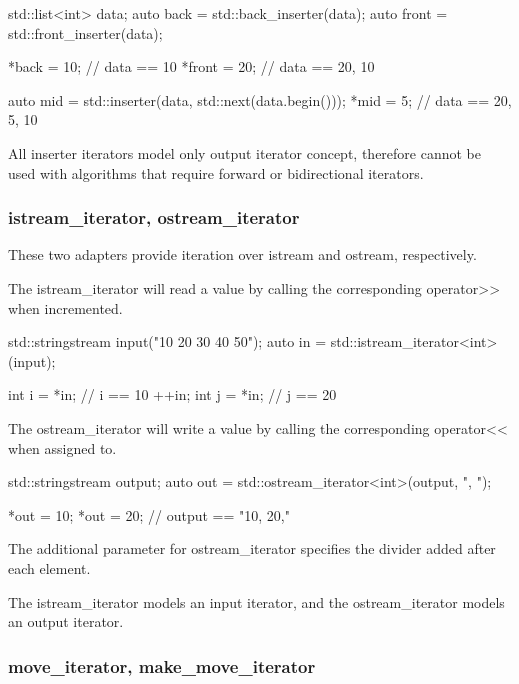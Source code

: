 \begin{box-note}
\begin{cppcode}
std::list<int> data;
auto back = std::back_inserter(data);
auto front = std::front_inserter(data);

*back = 10;
// data == { 10 }
*front = 20;
// data == { 20, 10 }

auto mid = std::inserter(data, std::next(data.begin()));
*mid = 5;
// data == { 20, 5, 10 }
\end{cppcode}
\end{box-note}

All inserter iterators model only output iterator concept, therefore cannot be used with algorithms that require forward or bidirectional iterators.

\subsubsection{istream\_iterator, ostream\_iterator}

These two adapters provide iteration over istream and ostream, respectively.

The istream\_iterator will read a value by calling the corresponding operator>> when incremented.

\begin{box-note}
\begin{cppcode}
std::stringstream input("10 20 30 40 50");
auto in = std::istream_iterator<int>(input);

int i = *in; // i == 10
++in;
int j = *in; // j == 20
\end{cppcode}
\end{box-note}

The ostream\_iterator will write a value by calling the corresponding operator<< when assigned to.

\begin{box-note}
\begin{cppcode}
std::stringstream output;
auto out = std::ostream_iterator<int>(output, ", ");

*out = 10;
*out = 20;
// output == "10, 20,"
\end{cppcode}
\end{box-note}

The additional parameter for ostream\_iterator specifies the divider added after each element.

The istream\_iterator models an input iterator, and the ostream\_iterator models an output iterator.

\subsubsection{move\_iterator, make\_move\_iterator}

